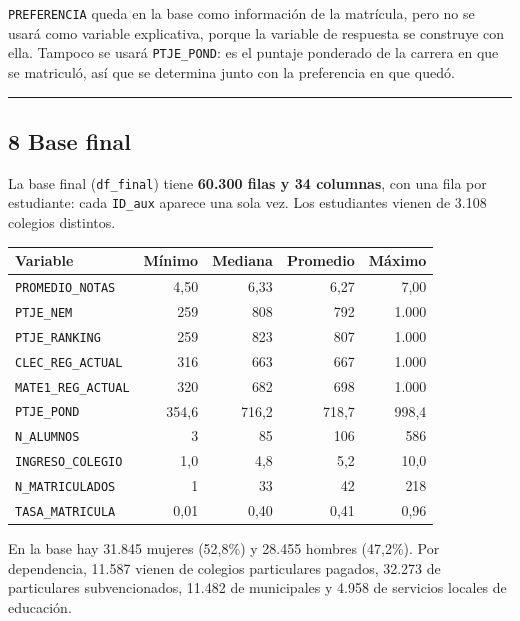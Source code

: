 \documentclass[11pt,letterpaper]{article}
\begin{document}
\texttt{PREFERENCIA} queda en la base como información de la matrícula,
pero no se usará como variable explicativa, porque la variable de
respuesta se construye con ella. Tampoco se usará \texttt{PTJE\_POND}:
es el puntaje ponderado de la carrera en que se matriculó, así que se
determina junto con la preferencia en que quedó.

\medskip\hrule\medskip

\subsection*{8 \; Base final}

La base final (\texttt{df\_final}) tiene \textbf{60.300 filas y 34
columnas}, con una fila por estudiante: cada \texttt{ID\_aux} aparece una
sola vez. Los estudiantes vienen de 3.108 colegios distintos.

\begin{center}
\begin{tabular}{lrrrr}
\toprule
\textbf{Variable} & \textbf{Mínimo} & \textbf{Mediana} & \textbf{Promedio} & \textbf{Máximo} \\
\midrule
\texttt{PROMEDIO\_NOTAS}   & 4,50  & 6,33  & 6,27  & 7,00 \\
\texttt{PTJE\_NEM}         & 259   & 808   & 792   & 1.000 \\
\texttt{PTJE\_RANKING}     & 259   & 823   & 807   & 1.000 \\
\texttt{CLEC\_REG\_ACTUAL} & 316   & 663   & 667   & 1.000 \\
\texttt{MATE1\_REG\_ACTUAL}& 320   & 682   & 698   & 1.000 \\
\texttt{PTJE\_POND}        & 354,6 & 716,2 & 718,7 & 998,4 \\
\texttt{N\_ALUMNOS}        & 3     & 85    & 106   & 586 \\
\texttt{INGRESO\_COLEGIO}  & 1,0   & 4,8   & 5,2   & 10,0 \\
\texttt{N\_MATRICULADOS}   & 1     & 33    & 42    & 218 \\
\texttt{TASA\_MATRICULA}   & 0,01  & 0,40  & 0,41  & 0,96 \\
\bottomrule
\end{tabular}
\end{center}

En la base hay 31.845 mujeres (52,8\%) y 28.455 hombres (47,2\%). Por
dependencia, 11.587 vienen de colegios particulares pagados, 32.273 de
particulares subvencionados, 11.482 de municipales y 4.958 de servicios
locales de educación.
\end{document}
